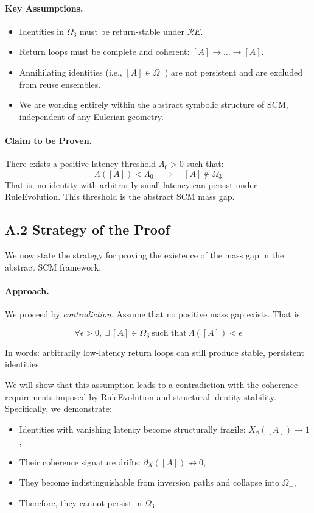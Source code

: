 \paragraph{Key Assumptions.}
\begin{itemize}
    \item Identities in $\Omega_3$ must be return-stable under $\mathcal{R}E$.
    \item Return loops must be complete and coherent: $[A] \to \ldots \to [A]$.
    \item Annihilating identities (i.e., $[A] \in \Omega_-$) are not persistent and are excluded from reuse ensembles.
    \item We are working entirely within the abstract symbolic structure of SCM, independent of any Eulerian geometry.
\end{itemize}

\paragraph{Claim to be Proven.}
There exists a positive latency threshold $\Lambda_0 > 0$ such that:
\[
\Lambda([A]) < \Lambda_0 \quad \Rightarrow \quad [A] \notin \Omega_3
\]
That is, no identity with arbitrarily small latency can persist under RuleEvolution. This threshold is the abstract SCM mass gap.

\subsection*{A.2 Strategy of the Proof}

We now state the strategy for proving the existence of the mass gap in the abstract SCM framework.

\paragraph{Approach.}  
We proceed by \textit{contradiction}. Assume that no positive mass gap exists. That is:

\[
\forall \epsilon > 0,\ \exists\ [A] \in \Omega_3\ \text{such that}\ \Lambda([A]) < \epsilon
\]

In words: arbitrarily low-latency return loops can still produce stable, persistent identities.

We will show that this assumption leads to a contradiction with the coherence requirements imposed by RuleEvolution and structural identity stability. Specifically, we demonstrate:

\begin{itemize}
    \item Identities with vanishing latency become structurally fragile: $X_\phi([A]) \to 1$,
    \item Their coherence signature drifts: $\partial \chi([A]) \not\to 0$,
    \item They become indistinguishable from inversion paths and collapse into $\Omega_-$,
    \item Therefore, they cannot persist in $\Omega_3$.
\end{itemize}


